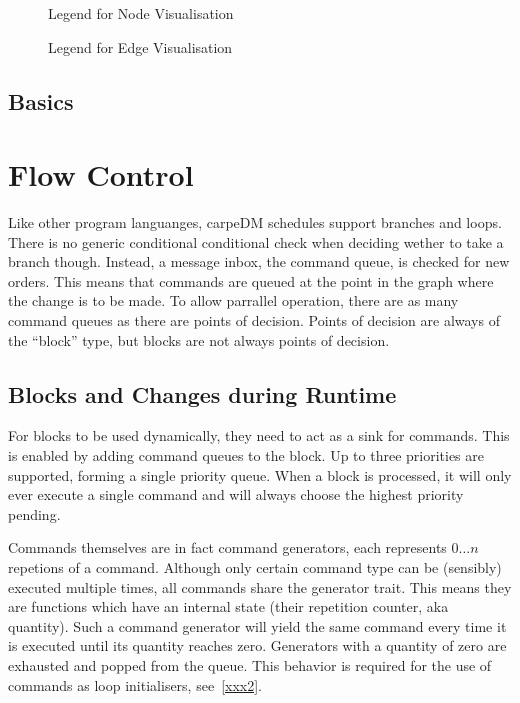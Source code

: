 \begin{figure}[H]
\def\svgwidth{0.8\textwidth}
\graphicspath{{Figures/}}

\caption{Legend for Node Visualisation }
\label{fig:legend_nodes}
\end{figure}

\begin{figure}[H]
\def\svgwidth{0.8\textwidth}
\graphicspath{{Figures/}}

\caption{Legend for Edge Visualisation }
\label{fig:legend_edges}
\end{figure}


\subsection{Basics}

\newpage
\section{Flow Control}
Like other program languanges, carpeDM schedules support branches and loops. There is no generic conditional conditional check when deciding wether to take a branch though. Instead, a message inbox,
the command queue, is checked for new orders. This means that commands are queued at the point in the graph where the change is to be made.
To allow parrallel operation, there are as many command queues as there are points of decision. Points of decision are always of the \enquote{block} type, but blocks are not always points of decision.

\subsection{Blocks and Changes during Runtime}
For blocks to be used dynamically, they need to act as a sink for commands. This is enabled by adding command queues to the block. Up to three priorities are supported, forming a single priority queue. When a block is processed, it will only ever execute a single command and will always choose the highest priority pending.
\par
Commands themselves are in fact command generators, each represents $0\dots n$ repetions of a command. Although only certain command type can be (sensibly) executed multiple times, all commands share the generator trait. This means they are functions which have an internal state (their repetition counter, aka quantity). Such a command generator will yield the same command every time it is executed until its quantity reaches zero. Generators with a quantity of zero are exhausted and popped from the queue. This behavior is required for the use of commands as loop initialisers, see~\ref{xxx2}.

